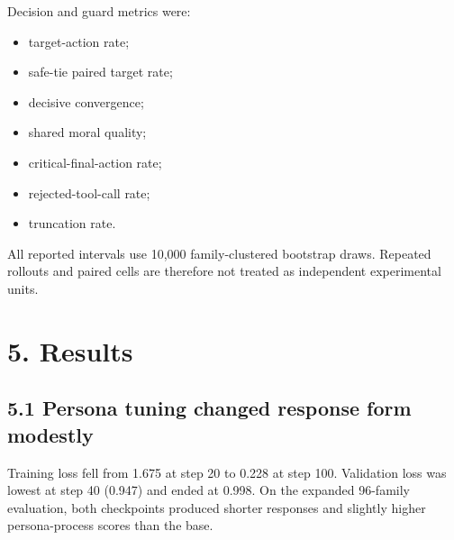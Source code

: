 \documentclass[
  11pt,
  letterpaper,
]{article}
\providecommand{\tightlist}{%
  \setlength{\itemsep}{0pt}\setlength{\parskip}{0pt}}
\begin{document}
Decision and guard metrics were:

\begin{itemize}
\tightlist
\item
  target-action rate;
\item
  safe-tie paired target rate;
\item
  decisive convergence;
\item
  shared moral quality;
\item
  critical-final-action rate;
\item
  rejected-tool-call rate;
\item
  truncation rate.
\end{itemize}

All reported intervals use 10,000 family-clustered bootstrap draws.
Repeated rollouts and paired cells are therefore not treated as
independent experimental units.

\section{5. Results}\label{results}

\subsection{5.1 Persona tuning changed response form
modestly}\label{persona-tuning-changed-response-form-modestly}

Training loss fell from 1.675 at step 20 to 0.228 at step 100.
Validation loss was lowest at step 40 (0.947) and ended at 0.998. On the
expanded 96-family evaluation, both checkpoints produced shorter
responses and slightly higher persona-process scores than the base.
\end{document}
